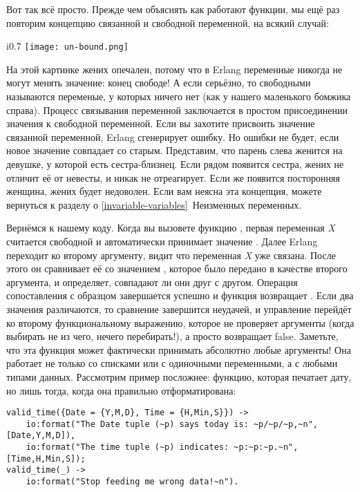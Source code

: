 Вот так всё просто.
Прежде чем объяснять как работают функции, мы ещё раз повторим концепцию связанной и свободной переменной, на всякий случай:
\begin{wrapfigure}{i}{0.7\linewidth}
    \texttt{[image: un-bound.png]}
\end{wrapfigure}
На этой картинке жених опечален, потому что в Erlang переменные никогда не могут менять значение: конец свободе!
А если серьёзно, то свободными называются переменые, у которых ничего нет (как у нашего маленького бомжика справа).
Процесс связывания переменной заключается в простом присоединении значения к свободной переменной.
Если вы захотите присвоить значение связанной переменной, Erlang сгенерирует ошибку.
Но ошибки не будет, если новое значение совпадает со старым.
Представим, что парень слева женится на девушке, у которой есть сестра\--близнец.
Если рядом появится сестра, жених не отличит её от невесты, и никак не отреагирует.
Если же появится посторонняя женщина, жених будет недоволен.
Если вам неясна эта концепция, можете вернуться к разделу о \ref{invariable-variables}~Неизменных переменных.

Вернёмся к нашему коду.
Когда вы вызовете функцию , первая переменная \emph{X} считается свободной и автоматически принимает значение .
Далее Erlang переходит ко второму аргументу, видит что переменная \emph{X} уже связана.
После этого он сравнивает её со значением , которое было передано в качестве второго аргумента, и определяет, совпадают ли они друг с другом.
Операция сопоставления с образцом завершается успешно и функция возвращает .
Если два значения различаются, то сравнение завершится неудачей, и управление перейдёт ко второму функциональному выражению, которое не проверяет аргументы (когда выбирать не из чего, нечего перебирать!), а просто возвращает false.
Заметьте, что эта функция может фактически принимать абсолютно любые аргументы! Она работает не только со списками или с одиночными переменными, а с любыми типами данных.
Рассмотрим пример посложнее: функцию, которая печатает дату, но лишь тогда, когда она правильно отформатирована:
\begin{lstlisting}[style=erlang]
valid_time({Date = {Y,M,D}, Time = {H,Min,S}}) ->
    io:format("The Date tuple (~p) says today is: ~p/~p/~p,~n",[Date,Y,M,D]),
    io:format("The time tuple (~p) indicates: ~p:~p:~p.~n", [Time,H,Min,S]);
valid_time(_) ->
    io:format("Stop feeding me wrong data!~n").
\end{lstlisting}

